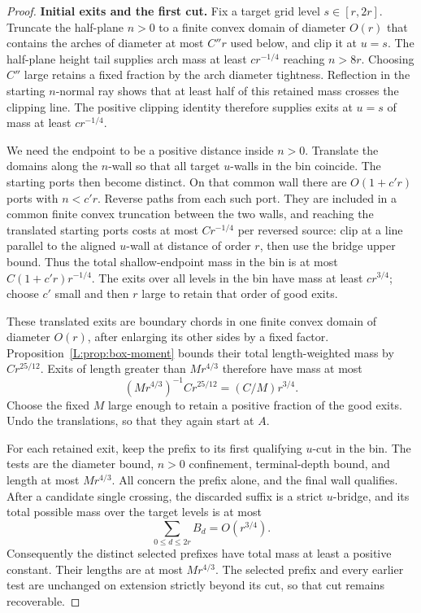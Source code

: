 \begin{proof}
\textbf{Initial exits and the first cut.}
Fix a target grid level \(s\in[r,2r]\). Truncate the half-plane \(n>0\)
to a finite convex domain of diameter \(O(r)\) that contains the arches
of diameter at most \(C''r\) used below, and clip it at \(u=s\).
The half-plane height tail supplies arch mass at least \(cr^{-1/4}\)
reaching \(n>8r\). Choosing \(C''\) large retains a fixed fraction by
the arch diameter tightness. Reflection in the starting \(n\)-normal
ray shows that at least half of this retained mass crosses the clipping
line. The positive clipping identity therefore supplies exits at \(u=s\)
of mass at least \(cr^{-1/4}\).

We need the endpoint to be a positive distance inside \(n>0\).
Translate the domains along the \(n\)-wall so that all target \(u\)-walls
in the bin coincide. The starting ports then become distinct. On that
common wall there are \(O(1+c'r)\) ports with \(n<c'r\). Reverse paths
from each such port. They are included in a common finite convex
truncation between the two walls, and reaching the translated starting
ports costs at most \(Cr^{-1/4}\) per reversed source: clip at a line
parallel to the aligned \(u\)-wall at distance of order \(r\), then use
the bridge upper bound. Thus the total shallow-endpoint mass in the bin
is at most \(C(1+c'r)r^{-1/4}\). The exits over all levels in the bin
have mass at least \(cr^{3/4}\); choose \(c'\) small and then \(r\)
large to retain that order of good exits.

These translated exits are boundary chords in one finite convex domain
of diameter \(O(r)\), after enlarging its other sides by a fixed factor.
Proposition~\ref{L:prop:box-moment} bounds their total length-weighted
mass by \(Cr^{25/12}\). Exits of length greater than \(Mr^{4/3}\)
therefore have mass at most
\[
 (Mr^{4/3})^{-1}Cr^{25/12}=(C/M)r^{3/4}.
\]
Choose the fixed \(M\) large enough to retain a positive fraction of
the good exits. Undo the translations, so that they again start at \(A\).

For each retained exit, keep the prefix to its first qualifying
\(u\)-cut in the bin. The tests are the diameter bound, \(n>0\)
confinement, terminal-depth bound, and length at most \(Mr^{4/3}\).
All concern the prefix alone, and the final wall qualifies. After a
candidate single crossing, the discarded suffix is a strict
\(u\)-bridge, and its total possible mass over the target levels is
at most
\[
 \sum_{0\le d\le2r}B_d=O(r^{3/4}).
\]
Consequently the distinct selected prefixes have total mass at least
a positive constant. Their lengths are at most \(Mr^{4/3}\).
The selected prefix and every earlier test are unchanged on extension
strictly beyond its cut, so that cut remains recoverable.


\end{proof}
